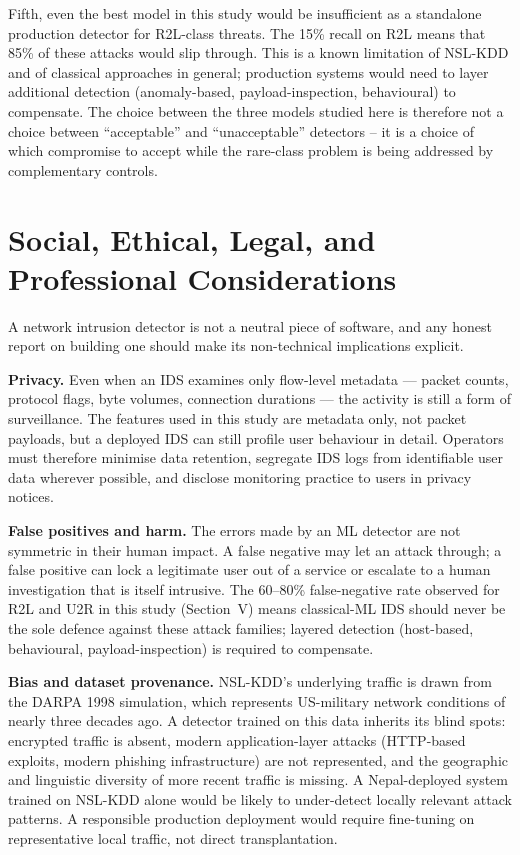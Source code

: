\documentclass[conference, twocolumn]{IEEEtran}
\begin{document}
Fifth, even the best model in this study would be insufficient as a standalone production detector for R2L-class threats. The 15\% recall on R2L means that 85\% of these attacks would slip through. This is a known limitation of NSL-KDD and of classical approaches in general; production systems would need to layer additional detection (anomaly-based, payload-inspection, behavioural) to compensate. The choice between the three models studied here is therefore not a choice between ``acceptable'' and ``unacceptable'' detectors -- it is a choice of which compromise to accept while the rare-class problem is being addressed by complementary controls.

\section{Social, Ethical, Legal, and Professional Considerations}

A network intrusion detector is not a neutral piece of software, and any honest report on building one should make its non-technical implications explicit.

\textbf{Privacy.} Even when an IDS examines only flow-level metadata --- packet counts, protocol flags, byte volumes, connection durations --- the activity is still a form of surveillance. The features used in this study are metadata only, not packet payloads, but a deployed IDS can still profile user behaviour in detail. Operators must therefore minimise data retention, segregate IDS logs from identifiable user data wherever possible, and disclose monitoring practice to users in privacy notices.

\textbf{False positives and harm.} The errors made by an ML detector are not symmetric in their human impact. A false negative may let an attack through; a false positive can lock a legitimate user out of a service or escalate to a human investigation that is itself intrusive. The 60--80\% false-negative rate observed for R2L and U2R in this study (Section~V) means classical-ML IDS should never be the sole defence against these attack families; layered detection (host-based, behavioural, payload-inspection) is required to compensate.

\textbf{Bias and dataset provenance.} NSL-KDD's underlying traffic is drawn from the DARPA 1998 simulation, which represents US-military network conditions of nearly three decades ago. A detector trained on this data inherits its blind spots: encrypted traffic is absent, modern application-layer attacks (HTTP-based exploits, modern phishing infrastructure) are not represented, and the geographic and linguistic diversity of more recent traffic is missing. A Nepal-deployed system trained on NSL-KDD alone would be likely to under-detect locally relevant attack patterns. A responsible production deployment would require fine-tuning on representative local traffic, not direct transplantation.
\end{document}
